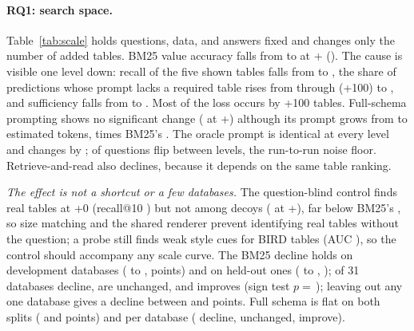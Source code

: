 \documentclass[11pt]{article}
\begin{document}

\paragraph{RQ1: search space.} Table~\ref{tab:scale} holds questions, data, and answers fixed and changes only the number of added tables. BM25 value accuracy falls from \bmValueAtZero{} to \bmValueTop{} at +\topLevel{} (\bmDeltaTop{}). The cause is visible one level down: recall of the five shown tables falls from \bmShownZero{} to \bmShownTop{}, the share of predictions whose prompt lacks a required table rises from \bmMissedZeroP{} through \bmMissedHundredP{} (+100) to \bmMissedTopP{}, and sufficiency falls from \bmSuffZero{} to \bmSuffTop{}. Most of the loss occurs by +100 tables. Full-schema prompting shows no significant change (\fsDeltaTop{} at +\topLevel{}) although its prompt grows from \fsTokZero{} to \fsTokTop{} estimated tokens, \tokRatioTop{} times BM25's \bmTokTop{}. The oracle prompt is identical at every level and changes by \orDeltaTop{}; \orFlips{} of \nQuestions{} questions flip between levels, the run-to-run noise floor. Retrieve-and-read also declines, because it depends on the same table ranking.

\emph{The effect is not a shortcut or a few databases.} The question-blind control finds real tables at +0 (recall@10 \qbRecallZero{}) but not among decoys (\qbRecallTop{} at +\topLevel{}), far below BM25's \bmRecallTop{}, so size matching and the shared renderer prevent identifying real tables without the question; a probe still finds weak style cues for BIRD tables (AUC \probeAucBird{}), so the control should accompany any scale curve. The BM25 decline holds on development databases (\bmDevZero{} to \bmDevTop{}, \bmDevDelta{} points) and on held-out ones (\bmTestZero{} to \bmTestTop{}, \bmTestDelta{}); \bmDbDecline{} of 31 databases decline, \bmDbSame{} are unchanged, and \bmDbImprove{} improves (sign test $p=$\,\bmSignP{}); leaving out any one database gives a decline between \bmLodoMin{} and \bmLodoMax{} points. Full schema is flat on both splits (\fsDevDelta{} and \fsTestDelta{} points) and per database (\fsDbDecline{} decline, \fsDbSame{} unchanged, \fsDbImprove{} improve).


\end{document}
